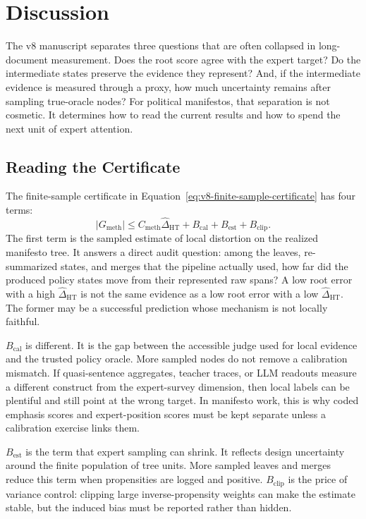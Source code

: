 \section{Discussion}\label{sec:v8-discussion}

The v8 manuscript separates three questions that are often collapsed in
long-document measurement. Does the root score agree with the expert target?
Do the intermediate states preserve the evidence they represent? And, if the
intermediate evidence is measured through a proxy, how much uncertainty remains
after sampling true-oracle nodes? For political manifestos, that separation is
not cosmetic. It determines how to read the current results and how to spend
the next unit of expert attention.

\subsection{Reading the Certificate}

The finite-sample certificate in
Equation~\eqref{eq:v8-finite-sample-certificate} has four terms:
\[
  |G_{\mathrm{meth}}|
  \le
  C_{\mathrm{meth}}\widehat{\Delta}_{\mathrm{HT}}
  +
  B_{\mathrm{cal}}
  +
  B_{\mathrm{est}}
  +
  B_{\mathrm{clip}} .
\]
The first term is the sampled estimate of local distortion on the realized
manifesto tree. It answers a direct audit question: among the leaves,
re-summarized states, and merges that the pipeline actually used, how far did
the produced policy states move from their represented raw spans? A low root
error with a high \(\widehat{\Delta}_{\mathrm{HT}}\) is not the same evidence
as a low root error with a low \(\widehat{\Delta}_{\mathrm{HT}}\). The former
may be a successful prediction whose mechanism is not locally faithful.

\(B_{\mathrm{cal}}\) is different. It is the gap between the accessible judge
used for local evidence and the trusted policy oracle. More sampled nodes do
not remove a calibration mismatch. If quasi-sentence aggregates, teacher
traces, or LLM readouts measure a different construct from the expert-survey
dimension, then local labels can be plentiful and still point at the wrong
target. In manifesto work, this is why coded emphasis scores and
expert-position scores must be kept separate unless a calibration exercise
links them.

\(B_{\mathrm{est}}\) is the term that expert sampling can shrink. It reflects
design uncertainty around the finite population of tree units. More sampled
leaves and merges reduce this term when propensities are logged and positive.
\(B_{\mathrm{clip}}\) is the price of variance control: clipping large
inverse-propensity weights can make the estimate stable, but the induced bias
must be reported rather than hidden.

